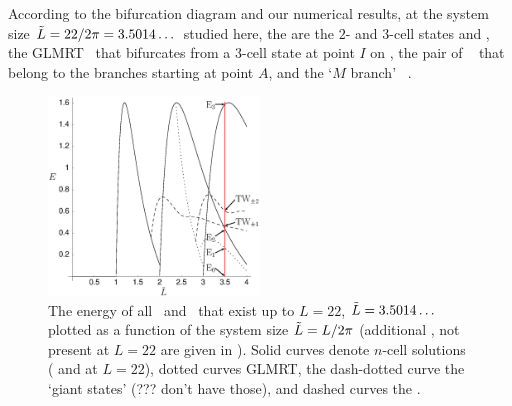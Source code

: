 
According to the bifurcation diagram
and our numerical results,
at the system size $\tilde{L}=22/2\pi = 3.5014\dots$ studied here,
the {\eqva} are the $2$- and $3$-cell states  and ,
the GLMRT \eqv\ that bifurcates from a $3$-cell state at point $I$
on ,
the pair of \reqva\  
that belong to the branches starting at point
$A$,
and the `$M$ branch'  \reqva\ .

\begin{figure}[t]       \label{fig:ksBifDiag}
\begin{center}
\includegraphics[width=0.5\textwidth]{figs/ksBifDiag_pst.eps}
\end{center}
\caption{
The energy   of all  \eqva\ and \reqva\
that exist up to $L=22$, $\tilde{L} = 3.5014\ldots$
plotted as a function of the system size
$\tilde{L} = L/2\pi$ (additional \eqva, not present at $L = 22$ are
given in \refref{ksgreene88}). Solid curves denote $n$-cell
solutions ( and  at $L = 22$), dotted curves GLMRT,
the dash-dotted curve the `giant states' (??? don't have those), and
dashed curves the \reqva. %
        }
\end{figure}


